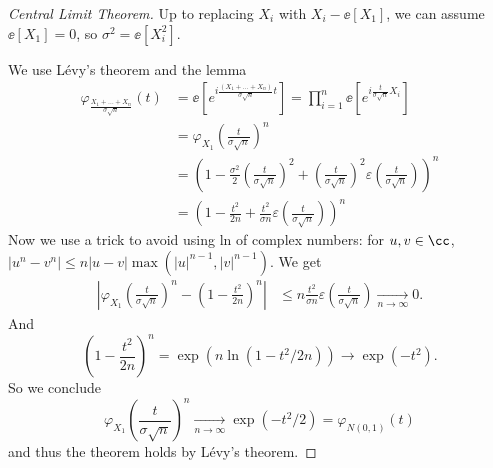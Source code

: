\documentclass[../main.tex]{subfiles}
\begin{document}
\begin{proof}
  [Central Limit Theorem]
  Up to replacing $X_i$ with $X_i - \ee[X_1]$, we can assume $\ee[X_1] = 0$, so
  $\sigma^2 = \ee[X_i^2]$.

  We use Lévy's theorem and the lemma
  \begin{align*}
    \varphi_{\frac{X_1 + \ldots + X_n}{\sigma\sqrt{n}}}(t) &=
    \ee \left[ e^{i \frac{(X_1 + \ldots + X_n)}{\sigma \sqrt{n}} t} \right]  
    = \prod_{i=1}^n \ee[e^{i \frac{t}{\sigma \sqrt{n}} X_i}] \tag*{by $\indep$}
    \\
    &= \varphi_{X_1} \left( \frac{t}{\sigma \sqrt{n}}  \right)^n \\ &= 
    \left(1 - \frac{\sigma^2}{2} \left( \frac{t}{\sigma\sqrt{n}}  \right)^2 + \left(
    \frac{t}{\sigma \sqrt{n}} \right)^2 \varepsilon \left( \frac{t}{\sigma
    \sqrt{n}}  \right) \right)^n \\
    &= \left(1 - \frac{t^2}{2n} + \frac{t^2}{\sigma n}\varepsilon \left(
    \frac{t}{\sigma \sqrt{n}}  \right) \right)^n
  \end{align*}
  Now we use a trick to avoid using ln of complex numbers: for $u, v \in \cc$,
  $|u^n - v^n| \leq n |u - v| \max(|u|^{n-1}, |v|^{n-1})$. We get
  \begin{align*}
    \left| \varphi_{X_1}\left( \frac{t}{\sigma \sqrt{n}}  \right)^n - \left( 1 -
    \frac{t^2}{2n} \right)^n  \right| 
    &\leq n \frac{t^2}{\sigma n} \varepsilon \left( \frac{t}{\sigma \sqrt{n}}
    \right) \underset{n \to \infty}{\longrightarrow} 0.
  \end{align*}
  And
  \[
    \left( 1 - \frac{t^2}{2n}  \right) ^n = \exp(n \ln(1 - t^2/2n)) \to
    \exp(-t^2)
  .\] 
So we conclude
\[
  \varphi_{X_1}\left( \frac{t}{\sigma \sqrt{n}}  \right) ^n \underset{n \to
  \infty}{\longrightarrow} \exp(-t^2/2) = \varphi_{N(0, 1)}(t)
\] 
and thus the theorem holds by Lévy's theorem.
\end{proof}
\end{document}
